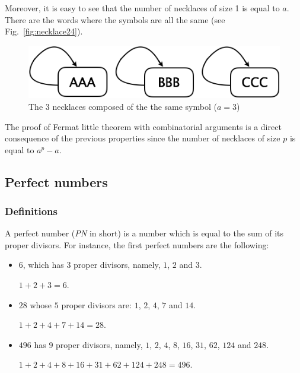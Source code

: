\begin{itemize}
Moreover, it is easy to see that the number of necklaces of size 1 is equal to $a$.
There are the words where the symbols are all the same (see Fig.~\ref{fig:necklace24}).

\begin{figure}[h]
\begin{center}
        \includegraphics[scale=0.3]{FiguresArithmetic/Necklace3.png}
        \caption{The 3 necklaces composed of the the same symbol ($a=3$)}
        \label{fig:necklace3}
\end{center}
\end{figure}

\end{itemize}

The proof of Fermat little theorem with combinatorial arguments is a direct consequence of the previous properties
since the number of necklaces of size $p$ is equal to $a^p - a$. 


\subsection{Perfect numbers}
\label{sec:perfectnumbers}

\subsubsection{Definitions}

A perfect number (\textit{PN} in short) is a number which is equal to the sum of its proper divisors.
For instance, the first perfect numbers are the following: 
\begin{itemize}
\item $6$, which has $3$ proper divisors, namely, $1$, $2$ and $3$.

$1+2+3=6$.
\item $28$ whose $5$ proper divisors are: $1$, $2$, $4$, $7$ and $14$.

$1+2+4+7+14=28$.
\item $496$ has $9$ proper divisors, namely, $1$, $2$, $4$, $8$, $16$, $31$, $62$, $124$ and $248$. 

$1+2+4+8+16+31+62+124+248=496$.
\end{itemize}


